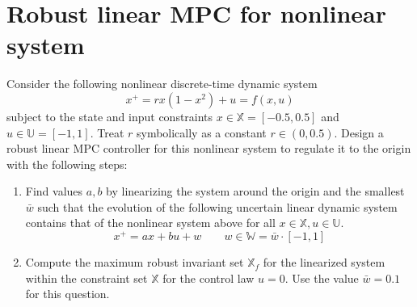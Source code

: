 \section{Robust linear MPC for nonlinear system}
Consider the following nonlinear discrete-time dynamic system 
\begin{equation*}
    x^+ = rx(1-x^2) + u = f(x,u)
\end{equation*}
subject to the state and input constraints $x \in \mathbb{X} = [-0.5, 0.5]$ and $u \in \mathbb{U} = [-1, 1]$. Treat $r$ symbolically as a constant $ r \in (0, 0.5)$. Design a robust linear MPC controller for this nonlinear system to regulate it to the origin with the following steps: 
\begin{enumerate}
    \item Find values $a, b$ by linearizing the system around the origin and the smallest $\bar{w}$ such that the evolution of the following uncertain linear dynamic system contains that of the nonlinear system above for all $x \in \mathbb{X}, u \in \mathbb{U}$. 
    \begin{equation*}
        x^+ = ax + bu + w \qquad w \in \mathbb{W} = \bar{w} \cdot [-1, 1]
    \end{equation*}

    \item Compute the maximum robust invariant set $\mathbb{X}_f$ for the linearized system within the constraint set $\mathbb{X}$ for the control law $u = 0$. Use the value $\bar{w}= 0.1$ for this question. 


\end{enumerate}
